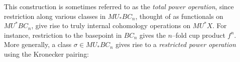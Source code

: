 \begin{remark}
This construction is sometimes referred to as the \textit{total power operation}, since restriction along various classes in $MU_* BC_n$, thought of as functionals on $MU^* BC_n$, give rise to truly internal cohomology operations on $MU^* X$.  For instance, restriction to the basepoint in $BC_n$ gives the $n$--fold cup product $f^{n}$.  More generally, a class $\sigma \in MU_* BC_n$ gives rise to a \textit{restricted power operation} using the Kronecker pairing:
\begin{center}
\end{center}
\end{remark}

